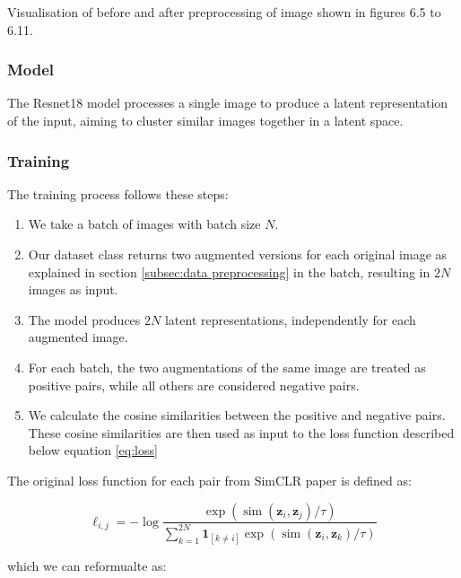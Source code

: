 \documentclass[12pt,twoside,a4paper,parskip]{scrbook} %
\begin{document}
Visualisation of before and after preprocessing of image shown in figures 6.5 to 6.11.

\subsubsection{Model}
The Resnet18 \cite{he2015deepresiduallearningimage} model processes a single image to produce a latent representation of the input, aiming to cluster similar images together in a latent space. 

\subsubsection{Training }
The training process follows these steps:

\begin{enumerate}
    \item We take a batch of images with batch size $N$.
    
    \item Our dataset class returns two augmented versions for each original image as explained in section \ref{subsec:data preprocessing} in the batch, resulting in $2N$ images as input.

    \item The model produces $2N$ latent representations, independently for each augmented image.

    \item For each batch, the two augmentations of the same image are treated as positive pairs, while all others are considered negative pairs.

    \item We calculate the cosine similarities between the positive and negative pairs. These cosine similarities are then used as input to the loss function described below equation \ref{eq:loss}
\end{enumerate}
The original loss function for each pair from SimCLR paper \cite{chen2020simple} is defined as:

\begin{equation}
\ell_{i, j} = -\log \frac{\exp \left(\operatorname{sim}\left(\boldsymbol{z}_i, \boldsymbol{z}_j\right) / \tau\right)}{\sum_{k=1}^{2 N} \mathbf{1}_{[k \neq i]} \exp \left(\operatorname{sim}\left(\boldsymbol{z}_i, \boldsymbol{z}_k\right) / \tau\right)}
\label{eq:original}
\end{equation}
  
which we can reformualte as:
\end{document}
